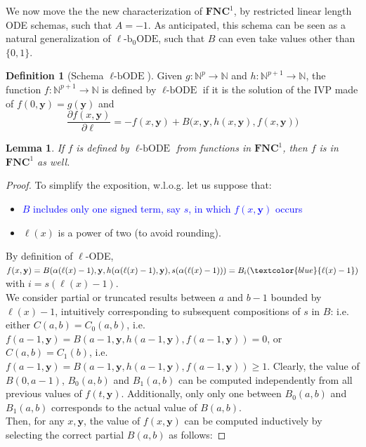 \documentclass[11pt, oneside]{article}
\newcommand{\Nat}{\mathbb{N}}
\newcommand{\NC}{\mathbf{FNC}}
\newcommand{\tu}[1]{\mathbf{#1}}
\newtheorem{lemma}{Lemma}
\theoremstyle{definition}
\newtheorem{defn}{Definition}
\newcommand{\schODE}{\ell\text{-b}_0\text{ODE}}
\newcommand{\chODE}{\ell\text{-bODE}}
\begin{document}
{We now move the the new characterization of $\NC^1$, by restricted linear length ODE schemas, such that $A=-1$.
As anticipated, this schema can be seen as a natural generalization of $\schODE$, such that $B$ can even take values other than $\{0,1\}$.


\begin{defn}[Schema $\chODE$]
    Given $g:\Nat^p \to \Nat$ and $h:\Nat^{p+1} \to \Nat$, the function $f:\Nat^{p+1} \to \Nat$ is defined by $\chODE$ if it is the solution of the IVP made of $f(0, \tu y)=g(\tu y)$ and 
    $$
        \frac{\partial f(x, \tu y)}{\partial \ell} = -f(x, \tu y) + B\big(x, \tu y, h(x, \tu y), f(x, \tu y)\big)
    $$
\end{defn}

\begin{lemma}\label{lemma:chODE}
    If $f$ is defined by $\chODE$ from functions in $\NC^1$, then $f$ is in $\NC^1$ as well.
\end{lemma}
\begin{proof}
    To simplify the exposition, w.l.o.g. let us suppose that:
    \begin{itemize}
        \itemsep0em
        \item \textcolor{blue}{$B$ includes only one signed term, say $s$, in which $f(x, \tu y)$ occurs}
        \item $\ell(x)$ is a power of two (to avoid rounding).
    \end{itemize}
    By definition of $\ell$-ODE, $f(x, \tu y)=B(\alpha(\ell(x)-1), \tu y, h(\alpha(\ell(x)-1), \tu y), s(\alpha(\ell(x)-1)))= B_i(\textcolor{blue}{\ell(x)-1})$ with $i=s(\ell(x)-1)$.
    \\
    We consider partial or truncated results between $a$ and $b-1$ bounded by $\ell(x)-1$, intuitively corresponding to subsequent compositions of $s$ in $B$: i.e. either $C(a,b)=C_0(a,b)$, i.e.~$f(a-1, \tu y)=B(a-1, \tu y, h(a-1,\tu y), f(a-1, \tu y))=0$, or $C(a,b)=C_1(b)$, i.e.~$f(a-1, \tu y)=B(a-1, \tu y, h(a-1, \tu y), f(a-1, \tu y))\ge 1$.
    Clearly, the value of $B(0, a-1)$, $B_0(a,b)$ and $B_1(a,b)$ can be computed independently from all previous values of $f(t,\tu y)$.
    Additionally, only only one between $B_0(a,b)$ and $B_1(a,b)$ corresponds to the actual value of $B(a,b)$.
    \\
    Then, for any $x,\tu y$, the value of $f(x, \tu y)$ can be computed inductively by selecting the correct partial $B(a,b)$ as follows:

\end{proof}}
\end{document}
